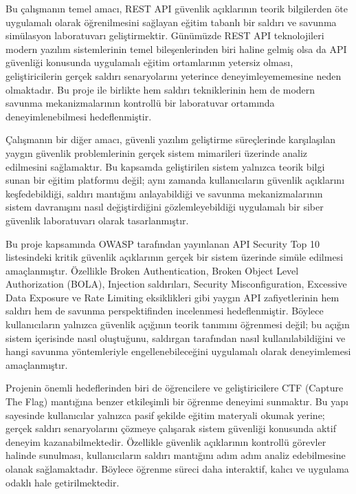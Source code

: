 Bu çalışmanın temel amacı, REST API güvenlik açıklarının teorik bilgilerden öte uygulamalı olarak öğrenilmesini sağlayan eğitim tabanlı bir saldırı ve savunma simülasyon laboratuvarı geliştirmektir. Günümüzde REST API teknolojileri modern yazılım sistemlerinin temel bileşenlerinden biri haline gelmiş olsa da API güvenliği konusunda uygulamalı eğitim ortamlarının yetersiz olması, geliştiricilerin gerçek saldırı senaryolarını yeterince deneyimleyememesine neden olmaktadır. Bu proje ile birlikte hem saldırı tekniklerinin hem de modern savunma mekanizmalarının kontrollü bir laboratuvar ortamında deneyimlenebilmesi hedeflenmiştir.

Çalışmanın bir diğer amacı, güvenli yazılım geliştirme süreçlerinde karşılaşılan yaygın güvenlik problemlerinin gerçek sistem mimarileri üzerinde analiz edilmesini sağlamaktır. Bu kapsamda geliştirilen sistem yalnızca teorik bilgi sunan bir eğitim platformu değil; aynı zamanda kullanıcıların güvenlik açıklarını keşfedebildiği, saldırı mantığını anlayabildiği ve savunma mekanizmalarının sistem davranışını nasıl değiştirdiğini gözlemleyebildiği uygulamalı bir siber güvenlik laboratuvarı olarak tasarlanmıştır.

Bu proje kapsamında OWASP tarafından yayınlanan API Security Top 10 listesindeki kritik güvenlik açıklarının gerçek bir sistem üzerinde simüle edilmesi amaçlanmıştır. Özellikle Broken Authentication, Broken Object Level Authorization (BOLA), Injection saldırıları, Security Misconfiguration, Excessive Data Exposure ve Rate Limiting eksiklikleri gibi yaygın API zafiyetlerinin hem saldırı hem de savunma perspektifinden incelenmesi hedeflenmiştir. Böylece kullanıcıların yalnızca güvenlik açığının teorik tanımını öğrenmesi değil; bu açığın sistem içerisinde nasıl oluştuğunu, saldırgan tarafından nasıl kullanılabildiğini ve hangi savunma yöntemleriyle engellenebileceğini uygulamalı olarak deneyimlemesi amaçlanmıştır.

Projenin önemli hedeflerinden biri de öğrencilere ve geliştiricilere CTF (Capture The Flag) mantığına benzer etkileşimli bir öğrenme deneyimi sunmaktır. Bu yapı sayesinde kullanıcılar yalnızca pasif şekilde eğitim materyali okumak yerine; gerçek saldırı senaryolarını çözmeye çalışarak sistem güvenliği konusunda aktif deneyim kazanabilmektedir. Özellikle güvenlik açıklarının kontrollü görevler halinde sunulması, kullanıcıların saldırı mantığını adım adım analiz edebilmesine olanak sağlamaktadır. Böylece öğrenme süreci daha interaktif, kalıcı ve uygulama odaklı hale getirilmektedir.

